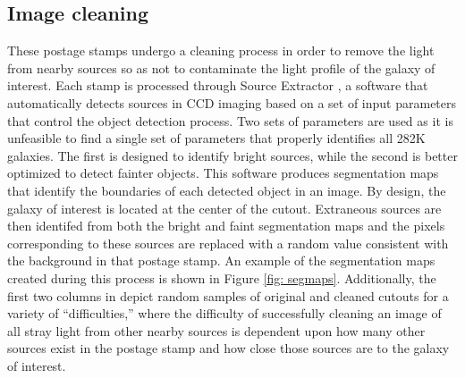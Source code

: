 \subsection{Image cleaning}
These postage stamps undergo a cleaning process in order to remove the light from nearby sources so as not to contaminate the light profile of the galaxy of interest. Each stamp is processed through Source Extractor \citep[ver. 2.8.6;][]{sextractor}, a software that automatically detects sources in CCD imaging based on a set of input parameters that control the object detection process. Two sets of parameters are used as it is unfeasible to find a single set of parameters that properly identifies all 282K galaxies. The first is designed to identify bright sources, while the second is better optimized to detect fainter objects. This software produces segmentation maps that identify the boundaries of each detected object in an image. By design, the galaxy of interest is located at the center of the cutout. Extraneous sources are then identifed from both the bright and faint segmentation maps and the pixels corresponding to these sources are replaced with a random value consistent with the background in that postage stamp.  An example of the segmentation maps created during this process is shown in Figure \ref{fig: segmaps}. Additionally, the first two columns in  depict random samples of original and cleaned cutouts for a variety of ``difficulties,'' where the difficulty of successfully cleaning an image of all stray light from other nearby sources is dependent upon how many other sources exist in the postage stamp and how close those sources are to the galaxy of interest. 


